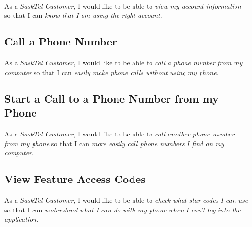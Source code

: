 \documentclass[12pt]{article}
\begin{document}
\paragraph{}	As a \textit{SaskTel Customer}, I would like to be able to \textit{view my account information} so that I can \textit{know that I am using the right account}.

\subsection{Call a Phone Number}
\paragraph{}	As a \textit{SaskTel Customer}, I would like to be able to \textit{call a phone number from my computer} so that I can \textit{easily make phone calls without using my phone}.

\subsection{Start a Call to a Phone Number from my Phone}
\paragraph{}	As a \textit{SaskTel Customer}, I would like to be able to \textit{call another phone number from my phone} so that I can \textit{more easily call phone numbers I find on my computer}.

\subsection{View Feature Access Codes}
\paragraph{}	As a \textit{SaskTel Customer}, I would like to be able to \textit{check what star codes I can use} so that I can \textit{understand what I can do with my phone when I can't log into the application}.
\end{document}
